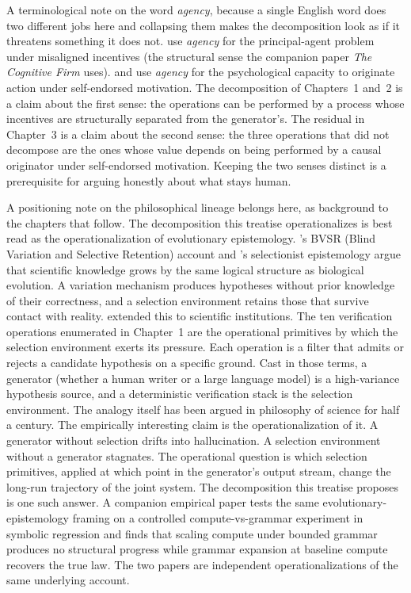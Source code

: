\documentclass[11pt]{article}
\begin{document}
A terminological note on the word \emph{agency}, because a single English word does two different jobs here and collapsing them makes the decomposition look as if it threatens something it does not. \citet{jensen1976} use \emph{agency} for the principal-agent problem under misaligned incentives (the structural sense the companion paper \emph{The Cognitive Firm} uses). \citet{bandura1989} and \citet{ryan2000} use \emph{agency} for the psychological capacity to originate action under self-endorsed motivation. The decomposition of Chapters~1 and~2 is a claim about the first sense: the operations can be performed by a process whose incentives are structurally separated from the generator's. The residual in Chapter~3 is a claim about the second sense: the three operations that did not decompose are the ones whose value depends on being performed by a causal originator under self-endorsed motivation. Keeping the two senses distinct is a prerequisite for arguing honestly about what stays human.


A positioning note on the philosophical lineage belongs here, as background to the chapters that follow. The decomposition this treatise operationalizes is best read as the operationalization of evolutionary epistemology. \citet{campbell1960}'s BVSR (Blind Variation and Selective Retention) account and \citet{popper1972}'s selectionist epistemology argue that scientific knowledge grows by the same logical structure as biological evolution. A variation mechanism produces hypotheses without prior knowledge of their correctness, and a selection environment retains those that survive contact with reality. \citet{hull1988} extended this to scientific institutions. The ten verification operations enumerated in Chapter~1 are the operational primitives by which the selection environment exerts its pressure. Each operation is a filter that admits or rejects a candidate hypothesis on a specific ground. Cast in those terms, a generator (whether a human writer or a large language model) is a high-variance hypothesis source, and a deterministic verification stack is the selection environment. The analogy itself has been argued in philosophy of science for half a century. The empirically interesting claim is the operationalization of it. A generator without selection drifts into hallucination. A selection environment without a generator stagnates. The operational question is which selection primitives, applied at which point in the generator's output stream, change the long-run trajectory of the joint system. The decomposition this treatise proposes is one such answer. A companion empirical paper \citep{alami2026c} tests the same evolutionary-epistemology framing on a controlled compute-vs-grammar experiment in symbolic regression and finds that scaling compute under bounded grammar produces no structural progress while grammar expansion at baseline compute recovers the true law. The two papers are independent operationalizations of the same underlying account.
\end{document}
